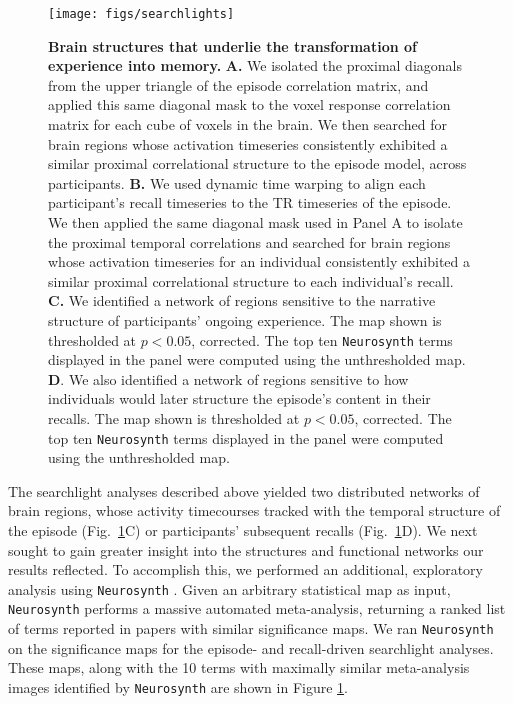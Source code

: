 \documentclass[10pt]{article}
\begin{document}
\begin{figure}[tp]
\centering
\texttt{[image: figs/searchlights]}
\caption{\small \textbf{Brain structures that underlie the transformation of experience into memory.} \textbf{A.} We isolated the proximal diagonals from the upper triangle of the episode correlation matrix, and applied this same diagonal mask to the voxel response correlation matrix for each cube of voxels in the brain. We then searched for brain regions whose activation timeseries consistently exhibited a similar proximal correlational structure to the episode model, across participants.  \textbf{B.} We used dynamic time warping \citep{BernClif94} to align each participant's recall timeseries to the TR timeseries of the episode.  We then applied the same diagonal mask used in Panel A to isolate the proximal temporal correlations and searched for brain regions whose activation timeseries for an individual consistently exhibited a similar proximal correlational structure to each individual's recall.  \textbf{C.} We identified a network of regions sensitive to the narrative structure of participants' ongoing experience.  The map shown is thresholded at $p < 0.05$, corrected.  The top ten \texttt{Neurosynth} terms displayed in the panel were computed using the unthresholded map.  \textbf{D}. We also identified a network of regions sensitive to how individuals would later structure the episode's content in their recalls.  The map shown is thresholded at $p < 0.05$, corrected.  The top ten \texttt{Neurosynth} terms displayed in the panel were computed using the unthresholded map.}
\label{fig:brainz}
\end{figure}

The searchlight analyses described above yielded two distributed networks of brain regions, whose activity timecourses tracked with the temporal structure of the episode (Fig.~\ref{fig:brainz}C) or participants' subsequent recalls (Fig.~\ref{fig:brainz}D).  We next sought to gain greater insight into the structures and functional networks our results reflected.  To accomplish this, we performed an additional, exploratory analysis using \texttt{Neurosynth} \citep{YarkEtal11}.  Given an arbitrary statistical map as input, \texttt{Neurosynth} performs a massive automated meta-analysis, returning a ranked list of terms reported in papers with similar significance maps. We ran \texttt{Neurosynth} on the significance maps for the episode- and recall-driven searchlight analyses. These maps, along with the 10 terms with maximally similar meta-analysis images identified by \texttt{Neurosynth} are shown in Figure \ref{fig:brainz}.
\end{document}
